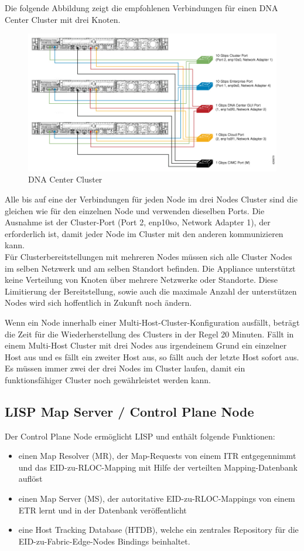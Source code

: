 Die folgende Abbildung zeigt die empfohlenen Verbindungen für einen DNA Center Cluster mit drei Knoten. 
\begin{figure}[H]
	\centering
	\includegraphics[width=0.8\linewidth]{img/Absicherung/DNAC-Cluster}
	\caption{DNA Center Cluster \cite{dnac-cluster} }
	\label{fig:DNA Center Cluster}
\end{figure}
Alle bis auf eine der Verbindungen für jeden Node im drei Nodes Cluster sind die gleichen wie für den einzelnen Node und verwenden dieselben Ports. Die Ausnahme ist der Cluster-Port (Port 2, enp10so, Network Adapter 1), der erforderlich ist, damit jeder Node im Cluster mit den anderen kommunizieren kann. \\

Für Clusterbereitstellungen mit mehreren Nodes müssen sich alle Cluster Nodes im selben Netzwerk und am selben Standort befinden. Die Appliance unterstützt keine Verteilung von Knoten über mehrere Netzwerke oder Standorte. Diese Limitierung der Bereitstellung, sowie auch die maximale Anzahl der unterstützen Nodes wird sich hoffentlich in Zukunft noch ändern.

Wenn ein Node innerhalb einer Multi-Host-Cluster-Konfiguration ausfällt, beträgt die Zeit für die Wiederherstellung des Clusters in der Regel 20 Minuten. Fällt in einem Multi-Host Cluster mit drei Nodes aus irgendeinem Grund ein einzelner Host aus und es fällt ein zweiter Host aus, so fällt auch der letzte Host sofort aus. Es müssen immer zwei der drei Nodes im Cluster laufen, damit ein funktionsfähiger Cluster noch gewährleistet werden kann.





\subsection{LISP Map Server / Control Plane Node}
Der Control Plane Node ermöglicht LISP und enthält folgende Funktionen:
\begin{itemize}
	\item einen Map Resolver (MR), der Map-Requests von einem ITR entgegennimmt und das EID-zu-RLOC-Mapping mit Hilfe der verteilten Mapping-Datenbank auflöst
	\item einen Map Server (MS), der autoritative EID-zu-RLOC-Mappings von einem ETR lernt und in der Datenbank veröffentlicht
	\item eine Host Tracking Database (HTDB), welche ein zentrales Repository für die EID-zu-Fabric-Edge-Nodes Bindings beinhaltet.
\end{itemize}

